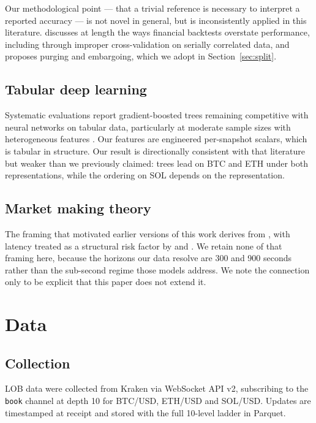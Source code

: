 \documentclass[11pt]{article}
\begin{document}
Our methodological point --- that a trivial reference is necessary to interpret
a reported accuracy --- is not novel in general, but is inconsistently applied
in this literature. \citet{lopezdeprado2018} discusses at length the ways
financial backtests overstate performance, including through improper
cross-validation on serially correlated data, and proposes purging and
embargoing, which we adopt in Section~\ref{sec:split}.

\subsection{Tabular deep learning}

Systematic evaluations report gradient-boosted trees remaining competitive with
neural networks on tabular data, particularly at moderate sample sizes with
heterogeneous features \citep{grinsztajn2022,shwartz2022}. Our features are
engineered per-snapshot scalars, which is tabular in structure. Our result is
directionally consistent with that literature but weaker than we previously
claimed: trees lead on BTC and ETH under both representations, while the
ordering on SOL depends on the representation.

\subsection{Market making theory}

The framing that motivated earlier versions of this work derives from
\citet{avellaneda2008}, with latency treated as a structural risk factor by
\citet{cartea2023} and \citet{lehalle2022}. We retain none of that framing here,
because the horizons our data resolve are 300 and 900 seconds rather than the
sub-second regime those models address. We note the connection only to be
explicit that this paper does not extend it.

\section{Data}
\label{sec:data}

\subsection{Collection}

LOB data were collected from Kraken via WebSocket API v2, subscribing to the
\texttt{book} channel at depth 10 for BTC/USD, ETH/USD and SOL/USD. Updates are
timestamped at receipt and stored with the full 10-level ladder in Parquet.
\end{document}
